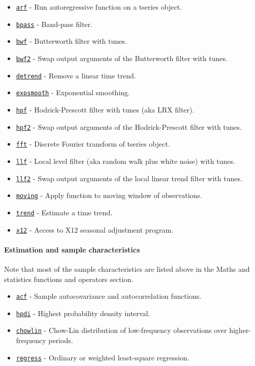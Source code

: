 \begin{itemize}
\itemsep1pt\parskip0pt
\item
  \href{tseries/arf}{\texttt{arf}} - Run autoregressive function on a
  tseries object.
\item
  \href{tseries/bpass}{\texttt{bpass}} - Band-pass filter.
\item
  \href{tseries/bwf}{\texttt{bwf}} - Butterworth filter with tunes.
\item
  \href{tseries/bwf2}{\texttt{bwf2}} - Swap output arguments of the
  Butterworth filter with tunes.
\item
  \href{tseries/detrend}{\texttt{detrend}} - Remove a linear time trend.
\item
  \href{tseries/expsmooth}{\texttt{expsmooth}} - Exponential smoothing.
\item
  \href{tseries/hpf}{\texttt{hpf}} - Hodrick-Prescott filter with tunes
  (aka LRX filter).
\item
  \href{tseries/hpf2}{\texttt{hpf2}} - Swap output arguments of the
  Hodrick-Prescott filter with tunes.
\item
  \href{tseries/fft}{\texttt{fft}} - Discrete Fourier transform of
  tseries object.
\item
  \href{tseries/llf}{\texttt{llf}} - Local level filter (aka random walk
  plus white noise) with tunes.
\item
  \href{tseries/llf2}{\texttt{llf2}} - Swap output arguments of the
  local linear trend filter with tunes.
\item
  \href{tseries/moving}{\texttt{moving}} - Apply function to moving
  window of observations.
\item
  \href{tseries/trend}{\texttt{trend}} - Estimate a time trend.
\item
  \href{tseries/x12}{\texttt{x12}} - Access to X12 seasonal adjustment
  program.
\end{itemize}

\paragraph{Estimation and sample
characteristics}

Note that most of the sample characteristics are listed above in the
Maths and statistics functions and operators section.

\begin{itemize}
\itemsep1pt\parskip0pt
\item
  \href{tseries/acf}{\texttt{acf}} - Sample autocovariance and
  autocorrelation functions.
\item
  \href{tseries/hpdi}{\texttt{hpdi}} - Highest probability density
  interval.
\item
  \href{tseries/chowlin}{\texttt{chowlin}} - Chow-Lin distribution of
  low-frequency observations over higher-frequency periods.
\item
  \href{tseries/regress}{\texttt{regress}} - Ordinary or weighted
  least-square regression.
\end{itemize}

